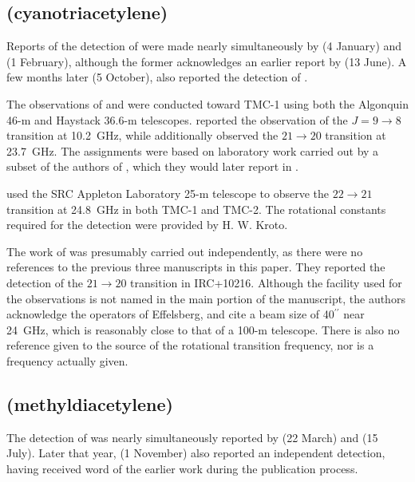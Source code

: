 \documentclass[twocolumn]{aastex631}
\begin{document}
	\subsection{ (cyanotriacetylene)}
	\label{HC7N}
	
	Reports of the detection of  were made nearly simultaneously by \citet{Little:1978hn} (4 January) and \citet{Kroto:1978fr} (1 February), although the former acknowledges an earlier report by \citet{Kroto:1977kq} (13 June).  A few months later (5 October), \citet{Winnewisser:1978bd} also reported the detection of . 
	
	The observations of \citet{Kroto:1977kq} and \citet{Kroto:1978fr} were conducted toward TMC-1 using both the Algonquin 46-m and Haystack 36.6-m telescopes.  \citet{Kroto:1977kq} reported the observation of the $J = 9\rightarrow8$ transition at 10.2~GHz, while \citet{Kroto:1978fr} additionally observed the $21\rightarrow20$ transition at 23.7~GHz.  The assignments were based on laboratory work carried out by a subset of the authors of \citet{Kroto:1978fr}, which they would later report in \citet{Kirby:1980ld}.
	
	\citet{Little:1978hn} used the SRC Appleton Laboratory 25-m telescope to observe the $22\rightarrow21$ transition at 24.8~GHz in both TMC-1 and TMC-2.  The rotational constants required for the detection were provided by H. W. Kroto.
	
	The work of \citet{Winnewisser:1978bd} was presumably carried out independently, as there were no references to the previous three manuscripts in this paper. They reported the detection of the $21\rightarrow20$ transition in IRC+10216.  Although the facility used for the observations is not named in the main portion of the manuscript, the authors acknowledge the operators of Effelsberg, and cite a beam size of 40$^{\prime\prime}$ near 24~GHz, which is reasonably close to that of a 100-m telescope.  There is also no reference given to the source of the rotational transition frequency, nor is a frequency actually given.
	
	\subsection{ (methyldiacetylene)}
	\label{CH3C4H}
	
	The detection of  was nearly simultaneously reported by \citet{Walmsley:1984od} (22 March) and \citet{MacLeod:1984er} (15 July).  Later that year, \citet{Loren:1984bc} (1 November) also reported an independent detection, having received word of the earlier work during the publication process.
	
\end{document}
